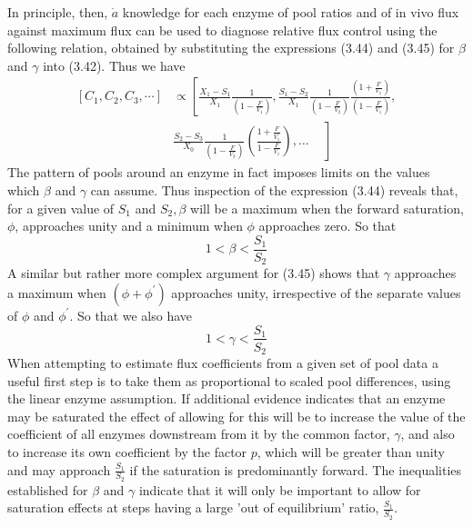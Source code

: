 In principle, then, $\dot{a}$ knowledge for each enzyme of pool ratios and of in vivo flux against maximum flux can be used to diagnose relative flux control using the following relation, obtained by substituting the expressions (3.44) and (3.45) for $\beta$ and $\gamma$ into (3.42). Thus we have
%
\begin{equation}
\begin{split}
  \left[C_{1}, C_{2}, C_{3}, \cdots\right] &\propto  \left[ \frac{X_{1}-S_{1}}{X_{1}} \frac{1}{\left(1-\frac{F}{V_{1}}\right)},
%
\frac{S_1-S_2}{X_1}  \frac{1}{\left(1-\frac{F}{V_2}\right)}  \frac{\left(1+\frac{F}{V_1}\right)}{\left(1-\frac{F}{V_1}\right)}, \right. \\[7pt]
%
&\left. \frac{S_2-S_3}{X_0} \frac{1}{\left(1-\frac{F}{V_3}\right)}\left(\frac{1+\frac{F}{V_{1}^{\prime}}}{1-\frac{F}{V_1}}\right), \ldots \hspace{14pt}  \right]
\end{split}
\label{eqn:346}
\end{equation}
%
The pattern of pools around an enzyme in fact imposes limits on the values which $\beta$ and $\gamma$ can assume. Thus inspection of the expression (3.44) reveals that, for a given value of $S_{1}$ and $S_{2}, \beta$ will be a maximum when the forward saturation, $\phi$, approaches unity and a minimum when $\phi$ approaches zero. So that
%
\begin{equation}
1 < \beta < \frac{S_{1}}{S_{2}}
\label{eqn:347}
\end{equation}
%
A similar but rather more complex argument for (3.45) shows that $\gamma$ approaches a maximum when $\left(\phi+\phi^{\prime}\right)$ approaches unity, irrespective of the separate values of $\phi$ and $\phi^{\prime}$. So that we also have
%
\begin{equation}
1 < \gamma < \frac{S_{1}}{S_{2}}
\label{eqn:348}
\end{equation}
%
When attempting to estimate flux coefficients from a given set of pool data a useful first step is to take them as proportional to scaled pool differences, using the linear enzyme assumption. If additional evidence indicates that an enzyme may be saturated the effect of allowing for this will be to increase the value of the coefficient of all enzymes downstream from it by the common factor, $\gamma$, and also to increase its own coefficient by the factor $p$, which will be greater than unity and may approach $\frac{S_1}{S_2}$ if the saturation is predominantly forward. The inequalities established for $\beta$ and $\gamma$ indicate that it will only be important to allow for saturation effects at steps having a large 'out of equilibrium' ratio, $\frac{S_1}{S_2}$.

